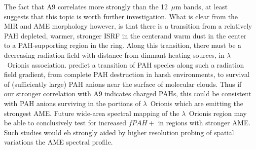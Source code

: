          The fact that A9 correlates more strongly than the 12~$\mu$m bands, at least suggests that this topic is worth further investigation. What is clear from the MIR and AME morphology however, is that there is a transition from a relatively PAH depleted, warmer, stronger ISRF in the centerand warm dust in the center to a PAH-supporting region in the ring. Along this transition, there must be a decreasing radiation field with distance from dimnant heating sources, in $\lambda$~Orionis association. \cite{andrews16} predict a transition of PAH species along such a radiation field gradient, from complete PAH destruction in harsh environments, to survival of (sufficiently large) PAH anions near the surface of molecular clouds. Thus if our stronger correlation with A9 indicates charged PAHs, this could be consistent with PAH anions surviving in the portions of $\lambda$~Orionis which are emitting the strongest AME. Future wide-area spectral mapping of the $\lambda$~Orionis region may be able to conclusively test for increased $fPAH+$ in regions with stronger AME. Such studies would eb strongly aided by higher resolution probing of spatial variations the AME spectral profile.
